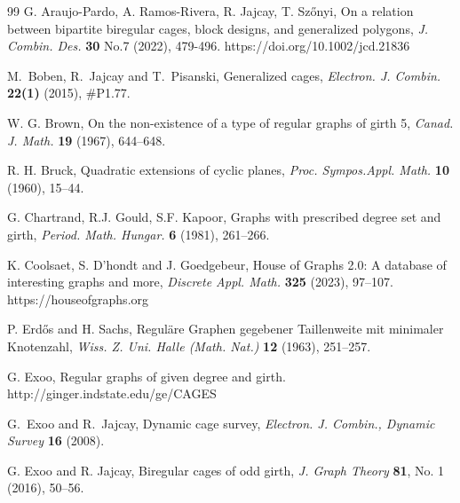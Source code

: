 \documentclass[a4paper,11pt]{article}
\begin{document}
\begin{thebibliography}{99}
G. Araujo-Pardo, A. Ramos-Rivera, R. Jajcay, T. Sz\H onyi, On a relation between bipartite biregular cages, block designs, and generalized polygons, {\em J. Combin. Des.} {\bf 30} No.7 (2022), 479-496. https://doi.org/10.1002/jcd.21836



  M.\ Boben, R.\ Jajcay and T.\ Pisanski, 
Generalized cages,
{\em Electron. J. Combin. } {\bf 22(1)} (2015), \#P1.77.

 W. G. Brown, On the non-existence of a type of regular graphs of girth 5, 
\emph{Canad. J. Math.} \textbf{19} (1967), 644--648.

R. H. Bruck, Quadratic extensions of cyclic planes, \emph{Proc. Sympos.Appl. Math.} 
\textbf{10} (1960), 15--44.


 G. Chartrand, R.J. Gould, S.F. Kapoor, 
 Graphs with prescribed degree set and girth, 
 \emph{Period. Math. Hungar.} \textbf{6} (1981), 261–266.

K. Coolsaet, S. D'hondt and J. Goedgebeur, House of Graphs 2.0: A database of interesting graphs and more, \emph{Discrete Appl. Math.} {\bf 325} (2023), 97--107. 
https://houseofgraphs.org


 
P.  Erd\H os  and  H.  Sachs,  Regul\"are  Graphen  gegebener  Taillenweite  mit  minimaler
Knotenzahl, \emph{Wiss. Z. Uni. Halle (Math. Nat.)} {\bf 12} (1963), 251--257.

G. Exoo, Regular graphs of given degree and girth.
http://ginger.indstate.edu/ge/CAGES


G.\ Exoo and R.\ Jajcay,
Dynamic cage survey,
{\em Electron. J. Combin., Dynamic Survey} {\bf 16} (2008).
    

G. Exoo and R. Jajcay, Biregular cages of odd girth, 
{\em J. Graph Theory} {\bf 81}, No. 1 (2016), 50--56. 



\end{thebibliography}
\end{document}

